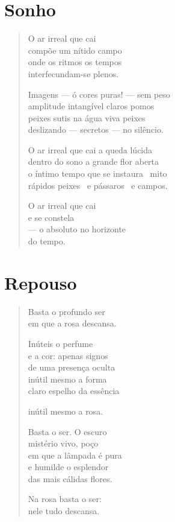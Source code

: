 \chapter{Sonho}

\begin{verse}
O ar irreal que cai\\
compõe um nítido campo\\
onde os ritmos \qquad os tempos\\
interfecundam-se \qquad plenos.

Imagens --- ó cores puras! --- sem peso\\
amplitude intangível \quad claros pomos\\
peixes sutis na água viva \qquad peixes\\
deslizando --- secretos --- no silêncio.

O ar irreal que cai \qquad a queda lúcida\\
dentro do sono \quad a grande flor aberta\\
o íntimo tempo que se instaura \mbox{ }mito\\
rápidos peixes \mbox{ }e pássaros \mbox{ }e campos.


O ar irreal que cai\\
e se constela\\
--- o absoluto no horizonte\\
\quad do tempo.
\end{verse}

\chapter{Repouso}

\begin{verse}
Basta o profundo ser\\
em que a rosa descansa.

Inúteis o perfume\\
e a cor: apenas signos\\
de uma presença oculta\\
inútil mesmo a forma\\
claro espelho da essência

inútil mesmo a rosa.

Basta o ser. O escuro\\
mistério vivo, poço\\
em que a lâmpada é pura\\
e humilde o esplendor\\
das mais cálidas flores.

Na rosa basta o ser:\\
nele tudo descansa.
\end{verse}

